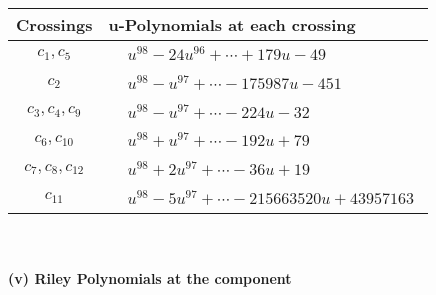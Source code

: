 \documentclass[1p]{elsarticle_modified}
\theoremstyle{definition}
\begin{document}
\begin{tabular}{m{50pt}|m{274pt}}
Crossings & \hspace{64pt}u-Polynomials at each crossing \\
\hline $$\begin{aligned}c_{1},c_{5}\end{aligned}$$&$\begin{aligned}
&u^{98}-24 u^{96}+\cdots+179 u-49
\end{aligned}$\\
\hline $$\begin{aligned}c_{2}\end{aligned}$$&$\begin{aligned}
&u^{98}- u^{97}+\cdots-175987 u-451
\end{aligned}$\\
\hline $$\begin{aligned}c_{3},c_{4},c_{9}\end{aligned}$$&$\begin{aligned}
&u^{98}- u^{97}+\cdots-224 u-32
\end{aligned}$\\
\hline $$\begin{aligned}c_{6},c_{10}\end{aligned}$$&$\begin{aligned}
&u^{98}+u^{97}+\cdots-192 u+79
\end{aligned}$\\
\hline $$\begin{aligned}c_{7},c_{8},c_{12}\end{aligned}$$&$\begin{aligned}
&u^{98}+2 u^{97}+\cdots-36 u+19
\end{aligned}$\\
\hline $$\begin{aligned}c_{11}\end{aligned}$$&$\begin{aligned}
&u^{98}-5 u^{97}+\cdots-215663520 u+43957163
\end{aligned}$\\
\hline
\end{tabular}\\~\\
\newpage\renewcommand{\arraystretch}{1}
\flushleft \textbf{(v) Riley Polynomials at the component}\newline \\
\end{document}
